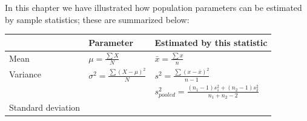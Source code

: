 \documentclass[
]{krantz}
\begin{document}
In this chapter we have illustrated how population parameters can be estimated by sample statistics; these are summarized below:

\doublespacing

\begin{longtable}[]{@{}lll@{}}
\toprule
\begin{minipage}[b]{0.30\columnwidth}\raggedright
\strut
\end{minipage} & \begin{minipage}[b]{0.30\columnwidth}\raggedright
Parameter\strut
\end{minipage} & \begin{minipage}[b]{0.30\columnwidth}\raggedright
Estimated by this statistic\strut
\end{minipage}\tabularnewline
\midrule
\endhead
\begin{minipage}[t]{0.30\columnwidth}\raggedright
Mean\strut
\end{minipage} & \begin{minipage}[t]{0.30\columnwidth}\raggedright
\(\mu = \frac{\sum{X}}{N}\)\strut
\end{minipage} & \begin{minipage}[t]{0.30\columnwidth}\raggedright
\(\bar{x} = \frac{\sum{x}}{n}\)\strut
\end{minipage}\tabularnewline
\begin{minipage}[t]{0.30\columnwidth}\raggedright
Variance\strut
\end{minipage} & \begin{minipage}[t]{0.30\columnwidth}\raggedright
\(\sigma^2 = \frac{\sum{(X - \mu)^2}}{N}\)\strut
\end{minipage} & \begin{minipage}[t]{0.30\columnwidth}\raggedright
\(s^2 = \frac{\sum{(x - \bar{x})^2}}{n-1}\)\strut
\end{minipage}\tabularnewline
\begin{minipage}[t]{0.30\columnwidth}\raggedright
\strut
\end{minipage} & \begin{minipage}[t]{0.30\columnwidth}\raggedright
\strut
\end{minipage} & \begin{minipage}[t]{0.30\columnwidth}\raggedright
\(s_{pooled}^2 = \frac{(n_1 -1)s_1^2 + (n_2 -1)s_2^2}{n_1 + n_2-2}\)\strut
\end{minipage}\tabularnewline
\begin{minipage}[t]{0.30\columnwidth}\raggedright
Standard deviation\strut
\end{minipage} & \begin{minipage}[t]{0.30\columnwidth}\raggedright

\end{minipage}
\end{longtable}
\end{document}

